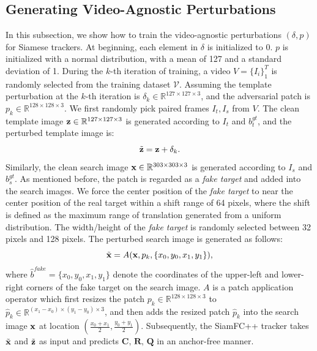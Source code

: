 \documentclass[journal]{IEEEtran}
\begin{document}
\subsection{Generating Video-Agnostic Perturbations}\label{generate}

In this subsection, we show how to train the video-agnostic perturbations $(\delta, p)$ for Siamese trackers. At beginning, each element in $\delta$ is initialized to 0. $p$ is initialized with a normal distribution, with a mean of 127 and a standard deviation of 1. During the $k$-th iteration of training, a video $V=\{I_i\}_1^T$ is randomly selected from the training dataset $\mathcal V$. Assuming the template perturbation at the $k$-th iteration is $\delta_k \in \mathbb{R}^{127\times 127 \times 3}$, and the adversarial patch is $p_k \in \mathbb{R}^{128\times 128\times 3}$. We first randomly pick paired frames $I_t, I_s$ from $V$. The clean template image $\textbf z\in \mathbb{R}^{127\times 127 \times 3}$ is generated according to $I_t$ and $b^{gt}_t$, and the perturbed template image is:
\begin{equation}
\tilde {\textbf z} = \textbf z + \delta_k.
\end{equation}
Similarly, the clean search image $\textbf x \in \mathbb{R}^{303\times 303 \times 3}$ is generated according to $I_s$ and $b^{gt}_s$.
As mentioned before, the patch is regarded as a \textit{fake target} and added into the search images. We force the center position of the \textit{fake target} to near the center position of the real target within a shift range of 64 pixels, where the shift is defined as the maximum range of translation generated from a uniform distribution.
The width/height of the \textit{fake target} is randomly selected between 32 pixels and 128 pixels.
The perturbed search image is generated as follows:
\begin{equation}
\tilde{\textbf x} = A(\textbf x, p_k, \{x_0, y_0, x_1, y_1\}),
\end{equation}
where $ \hat b^{fake} = \{x_0, y_0, x_1, y_1\}$ denote the coordinates of the upper-left and lower-right corners of the fake target on the search image. $A$ is a patch application operator \cite{patch} which first resizes the patch $p_k \in \mathbb{R}^{128\times 128\times 3}$ to $\hat{p}_k \in \mathbb{R}^{(x_1-x_0)\times (y_1-y_0)\times 3}$, and then adds the resized patch $\hat{p}_k$ into the search image $\textbf x$ at location $(\frac{x_0+x_1}{2},\frac{y_0+y_1}{2})$. Subsequently, the SiamFC++ tracker takes $\tilde {\textbf x}$ and $\tilde{\textbf z}$ as input and predicts $\textbf{C, R, Q}$ in an anchor-free manner.
\end{document}
